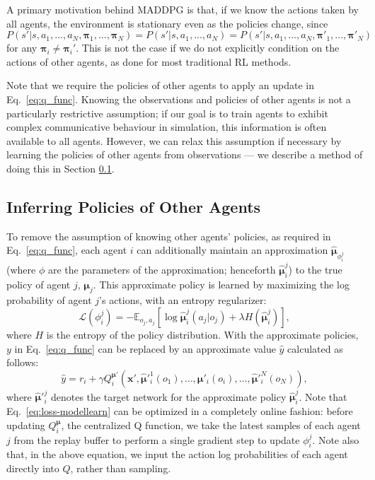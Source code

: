 \documentclass{article}
\newcommand{\pol}[0]{\pmb{\pi}}
\newcommand{\cpol}[0]{\pmb{\mu}}
\begin{document}
A primary motivation behind MADDPG is that, if we know the actions taken by all agents, the environment is stationary even as the policies change, since $P(s'|s,a_1,...,a_N,\pol_1,...,\pol_N) = P(s'|s,a_1,...,a_N) = P(s'|s,a_1,...,a_N,\pol'_1,...,\pol'_N)$ for any $\pol_i \neq \pol_i'$. This is not the case if we do not explicitly condition on the actions of other agents, as done for most traditional RL methods. 

Note that we require the policies of other agents to apply an update in Eq.~\ref{eq:q_func}. Knowing the observations and policies of other agents is not a particularly restrictive assumption; if our goal is to train agents to exhibit complex communicative behaviour in simulation, this information is often available to all agents.
However, we can relax this assumption if necessary by learning the policies of other agents from observations --- we describe a method of doing this in Section \ref{sec:modellearning}.


\subsection{Inferring Policies of Other Agents}
\label{sec:modellearning}
To remove the assumption of knowing other agents' policies, as required in Eq.~\ref{eq:q_func}, each agent $i$ can additionally maintain an approximation $\hat{\cpol}_{\phi_i^j}$ (where $\phi$ are the parameters of the approximation; henceforth $\hat{\cpol}_i^j$) to the true policy of agent $j$, $\cpol_j$. This approximate policy is learned by maximizing the log probability of agent $j$'s actions, with an entropy regularizer:
\begin{equation}\label{eq:loss-modellearn}
\mathcal{L}(\phi_i^j)=-\mathbb{E}_{o_j,a_j}\left[\log \hat{\cpol}_i^j(a_j|o_j) + \lambda H(\hat{\cpol}_i^j) \right],
\end{equation}
where $H$ is the entropy of the policy distribution. With the approximate policies, $y$ in Eq.~\ref{eq:q_func} can be replaced by an approximate value $\hat{y}$ calculated as follows: 
\begin{equation}\label{eq:approx_q_func}
\hat{y} = r_i + \gamma Q^{\cpol'}_i(\mathbf{x}', \hat{\cpol}'^1_i(o_1),\ldots,\cpol'_i(o_i),\ldots,\hat{\cpol}'^N_i(o_N)),
\end{equation}
where $\hat{\cpol}'^j_i$ denotes the target network for the approximate policy $\hat{\cpol}_i^j$.
Note that Eq.~\ref{eq:loss-modellearn} can be optimized in a completely online fashion: before updating  $Q^{\cpol}_i$, the centralized Q function, we take the latest samples of each agent $j$ from the replay buffer to perform a single gradient step to update $\phi_i^j$. Note also that, in the above equation, we input the action log probabilities of each agent directly into $Q$, rather than sampling.
\end{document}
